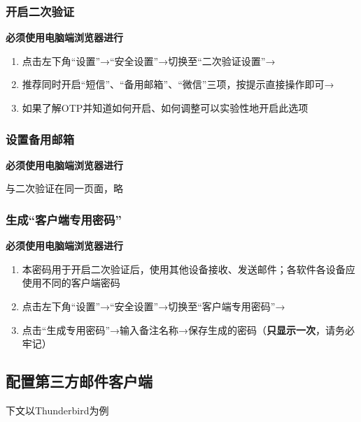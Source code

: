 \subsubsection[开启二次验证]{开启二次验证}
\textbf{必须使用电脑端浏览器进行}
\begin{enumerate}
    \item 点击左下角“设置”→“安全设置”→切换至“二次验证设置”→
    \item 推荐同时开启“短信”、“备用邮箱”、“微信”三项，按提示直接操作即可→
    \item 如果了解OTP并知道如何开启、如何调整可以实验性地开启此选项
\end{enumerate}

\subsubsection[设置备用邮箱]{设置备用邮箱}
\textbf{必须使用电脑端浏览器进行}

与二次验证在同一页面，略

\subsubsection[生成“客户端专用密码”]{生成“客户端专用密码”}
\textbf{必须使用电脑端浏览器进行}
\begin{enumerate}
    \item 本密码用于开启二次验证后，使用其他设备接收、发送邮件；各软件各设备应使用不同的客户端密码
    \item 点击左下角“设置”→“安全设置”→切换至“客户端专用密码”→
    \item 点击“生成专用密码”→输入备注名称→保存生成的密码（\textbf{只显示一次}，请务必牢记）
\end{enumerate}

\subsection[配置第三方邮件客户端]{配置第三方邮件客户端}
下文以Thunderbird为例\footnotemark
{}

